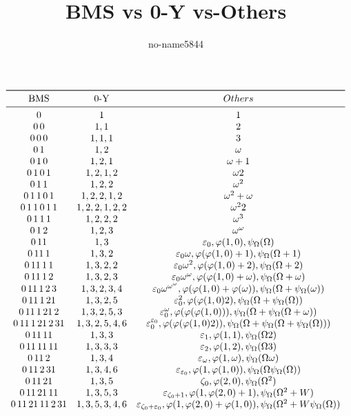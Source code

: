 \documentclass[UTF8]{ctexart}
\title{BMS vs 0-Y vs-Others}   %
\author{no-name5844}
\newcommand{\W}{\Omega}
\renewcommand{\v}{\varphi}
\newcommand{\p}{\psi}
\newcommand{\pW}{\p_\W}
\newcommand{\w}{\omega}
\newcommand{\e}{\varepsilon}
\newcommand{\z}{\zeta}
\begin{document}
\maketitle

\[
\begin{array}{ccc}
  \toprule
  \text{BMS}& \text{0-Y} & Others \\   %
  \midrule
  0&1&1\\
  0\,0&1,1&2\\
  0\,0\,0&1,1,1&3\\
  0\,1&1,2&\w\\
  0\,1\,0&1,2,1&\w+1\\
  0\,1\,0\,1&1,2,1,2&\w2\\
  0\,1\,1&1,2,2&\w^2\\
  0\,1\,1\,0\,1&1,2,2,1,2&\w^2+\w\\
  0\,1\,1\,0\,1\,1&1,2,2,1,2,2&\w^2 2\\
  0\,1\,1\,1&1,2,2,2&\w^3\\
  0\,1\,2&1,2,3&\w^\w\\
  0\,11&1,3&\e_0,\v(1,0),\pW(\W)\\
  0\,11\,1&1,3,2&\e_0\w,\v(\v(1,0)+1),\pW(\W+1)\\
  0\,11\,1\,1&1,3,2,2&\e_0\w^2,\v(\v(1,0)+2),\pW(\W+2)\\
  0\,11\,1\,2&1,3,2,3&\e_0\w^\w,\v(\v(1,0)+\w),\pW(\W+\w)\\
  0\,11\,1\,2\,3&1,3,2,3,4&\e_0\w^{\w^\w},\v(\v(1,0)+\v(\w)),\pW(\W+\pW(\w))\\
  0\,11\,1\,21&1,3,2,5&\e_0^2,\v(\v(1,0)2),\pW(\W+\pW(\W))\\
  0\,11\,1\,21\,2&1,3,2,5,3&\e_0^\w,\v(\v(\v(1,0))),\pW(\W+\pW(\W+\w))\\
  0\,11\,1\,21\,2\,31&1,3,2,5,4,6&\e_0^{\e_0},\v(\v(\v(1,0)2)),\pW(\W+\pW(\W+\pW(\W)))\\
  0\,11\,11&1,3,3&\e_1,\v(1,1),\pW(\W2)\\
  0\,11\,11\,11&1,3,3,3&\e_2,\v(1,2),\pW(\W3)\\
  0\,11\,2&1,3,4&\e_\w,\v(1,\w),\pW(\W\w)\\
  0\,11\,2\,31&1,3,4,6&\e_{\e_0},\v(1,\v(1,0)),\pW(\W\pW(\W))\\
  0\,11\,21&1,3,5&\z_0,\v(2,0),\pW(\W^2)\\
  0\,11\,21\,11&1,3,5,3&\e_{\z_0+1},\v(1,\v(2,0)+1),\pW(\W^2+W)\\
  0\,11\,21\,11\,2\,31&1,3,5,3,4,6&\e_{\z_0+\e_0},\v(1,\v(2,0)+\v(1,0)),\pW(\W^2+W\pW(\W))\\

\end{array}\]
\end{document}

